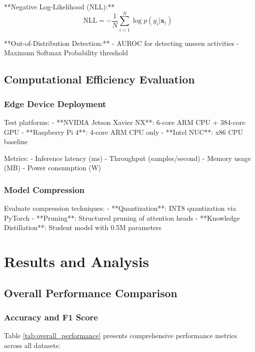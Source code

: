 \documentclass[10pt,journal,compsoc]{IEEEtran}
\begin{document}
**Negative Log-Likelihood (NLL):**
\begin{equation}
\text{NLL} = -\frac{1}{N} \sum_{i=1}^{N} \log p(y_i | \mathbf{x}_i)
\end{equation}

**Out-of-Distribution Detection:**
- AUROC for detecting unseen activities
- Maximum Softmax Probability threshold

\subsection{Computational Efficiency Evaluation}

\subsubsection{Edge Device Deployment}

Test platforms:
- **NVIDIA Jetson Xavier NX**: 6-core ARM CPU + 384-core GPU
- **Raspberry Pi 4**: 4-core ARM CPU only
- **Intel NUC**: x86 CPU baseline

Metrics:
- Inference latency (ms)
- Throughput (samples/second)
- Memory usage (MB)
- Power consumption (W)

\subsubsection{Model Compression}

Evaluate compression techniques:
- **Quantization**: INT8 quantization via PyTorch
- **Pruning**: Structured pruning of attention heads
- **Knowledge Distillation**: Student model with 0.5M parameters

\section{Results and Analysis}
\label{sec:results}

\subsection{Overall Performance Comparison}

\subsubsection{Accuracy and F1 Score}

Table \ref{tab:overall_performance} presents comprehensive performance metrics across all datasets:
\end{document}
